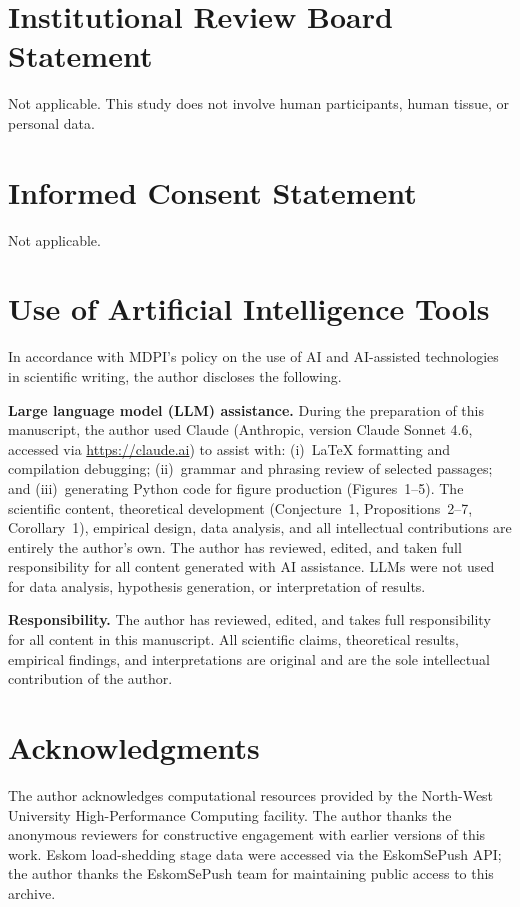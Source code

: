\documentclass[11pt,a4paper]{article}  %
\theoremstyle{plain}
\theoremstyle{definition}
\theoremstyle{remark}
\begin{document}
\section*{Institutional Review Board Statement}

Not applicable. This study does not involve human participants,
human tissue, or personal data.

\section*{Informed Consent Statement}

Not applicable.

\section*{Use of Artificial Intelligence Tools}

In accordance with MDPI's policy on the use of AI and
AI-assisted technologies in scientific writing, the author
discloses the following.

\textbf{Large language model (LLM) assistance.} During the
preparation of this manuscript, the author used Claude
(Anthropic, version Claude Sonnet 4.6, accessed via
\url{https://claude.ai}) to assist with: (i)~LaTeX formatting
and compilation debugging; (ii)~grammar and phrasing review of
selected passages; and (iii)~generating Python code for figure
production (Figures~1--5). The scientific content, theoretical
development (Conjecture~1, Propositions~2--7, Corollary~1),
empirical design, data analysis, and all intellectual contributions
are entirely the author's own. The author has reviewed, edited,
and taken full responsibility for all content generated with
AI assistance. LLMs were not used for data analysis, hypothesis
generation, or interpretation of results.

\textbf{Responsibility.} The author has reviewed, edited, and
takes full responsibility for all content in this manuscript.
All scientific claims, theoretical results, empirical findings,
and interpretations are original and are the sole intellectual
contribution of the author.

\section*{Acknowledgments}

The author acknowledges computational resources provided by the
North-West University High-Performance Computing facility. The
author thanks the anonymous reviewers for constructive engagement
with earlier versions of this work. Eskom load-shedding stage
data were accessed via the EskomSePush API; the author thanks
the EskomSePush team for maintaining public access to this archive.
\end{document}
